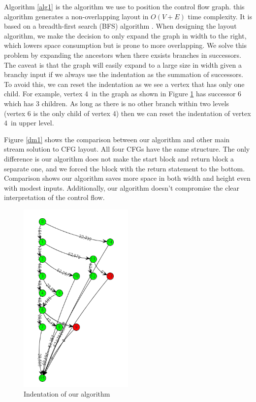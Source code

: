 \documentclass[conference,10pt,twocolumn]{./IEEE/IEEEtran}
\begin{document}
Algorithm \ref{alg1} is the algorithm we use to position the control flow graph.
this algorithm generates a non-overlapping layout in $O (V+E)$ time complexity.
It is based on a breadth-first search (BFS) algorithm \cite{kamada1989algorithm}.
When designing the layout algorithm, we make the decision to only expand the graph in width to the right, which lowers space consumption but is prone to more overlapping.
We solve this problem by expanding the ancestors when there exsists branches in successors.
The caveat is that the graph will easily expand to a large size in width given a branchy input if we always use the indentation as the summation of successors.
To avoid this, we can reset the indentation as we see a vertex that has only one child.
For example, vertex 4\ in the graph as shown in Figure \ref{eg1} has successor 6 which has 3 children.
As long as there is no other branch within two levels (vertex 6 is the only child of vertex 4) then we can reset the indentation of vertex 4\ in upper level.

Figure \ref{dm1} shows the comparison between our algorithm and other main stream solution to CFG layout.
All four CFGs have the same structure.
The only difference is our algorithm does not make the start block and return block a separate one, and we forced the block with the return statement to the bottom.
Comparison shows our algorithm saves more space in both width and height even with modest inputs.
Additionally, our algorithm doesn't compromise the clear interpretation of the control flow.

\begin{figure}[h]
\center
  \includegraphics[width=0.5\textwidth]{layout_demo2.png}
  \caption{Indentation of our algorithm}
  \label{eg1}
\end{figure}
\end{document}
